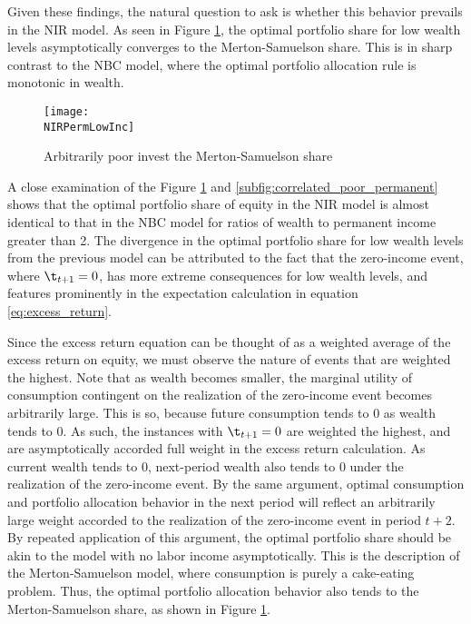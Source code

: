 Given these findings, the natural question to ask is whether this behavior prevails in the NIR model. As seen in Figure \ref{fig:zeroInc_poor}, the optimal portfolio share for low wealth levels asymptotically converges to the Merton-Samuelson share. This is in sharp contrast to the NBC model, where the optimal portfolio allocation rule is monotonic in wealth.

\begin{figure}[h]
    \centering
    \texttt{[image: \\NIRPermLowInc]}
    \caption{Arbitrarily poor invest the Merton-Samuelson share}
    \label{fig:zeroInc_poor}
\end{figure}

A close examination of the Figure \ref{fig:zeroInc_poor} and \ref{subfig:correlated_poor_permanent} shows that the optimal portfolio share of equity in the NIR model is almost identical to that in the NBC model for ratios of wealth to permanent income greater than 2. The divergence in the optimal portfolio share for low wealth levels from the previous model can be attributed to the fact that the zero-income event, where $\t_{t+1} = 0$, has more extreme consequences for low wealth levels, and features prominently in the expectation calculation in equation \eqref{eq:excess_return}.

Since the excess return equation can be thought of as a weighted average of the excess return on equity, we must observe the nature of events that are weighted the highest. Note that as wealth becomes smaller, the marginal utility of consumption contingent on the realization of the zero-income event becomes arbitrarily large. This is so, because future consumption tends to 0 as wealth tends to 0. As such, the instances with $\t_{t+1} = 0$ are weighted the highest, and are asymptotically accorded full weight in the excess return calculation. As current wealth tends to 0, next-period wealth also tends to 0 under the realization of the zero-income event. By the same argument, optimal consumption and portfolio allocation behavior in the next period will reflect an arbitrarily large weight accorded to the realization of the zero-income event in period $t+2$. By repeated application of this argument, the optimal portfolio share should be akin to the model with no labor income asymptotically. This is the description of the Merton-Samuelson model, where consumption is purely a cake-eating problem. Thus, the optimal portfolio allocation behavior also tends to the Merton-Samuelson share, as shown in Figure \ref{fig:zeroInc_poor}.

